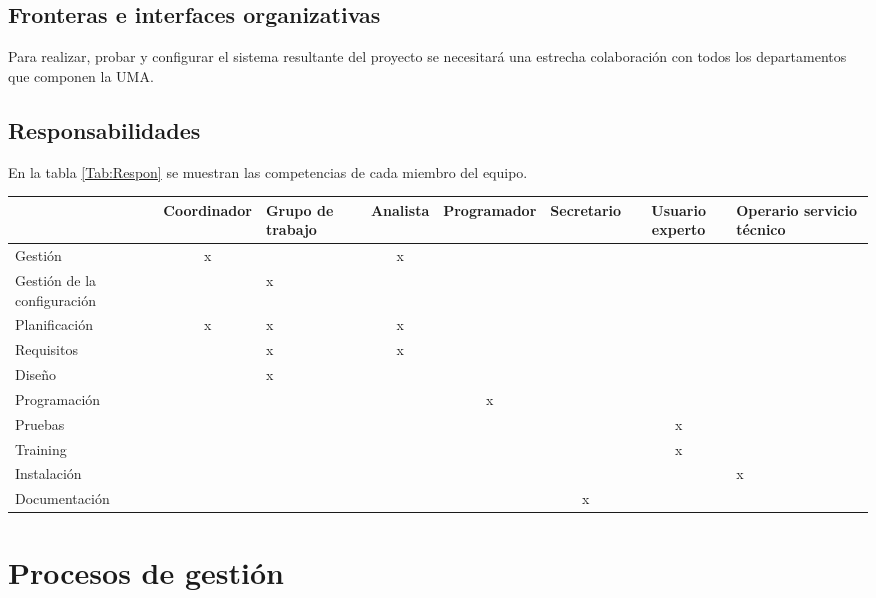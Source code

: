\documentclass[11pt,a4paper,spanish,twoside]{report}
\begin{document}
\section{Fronteras e interfaces organizativas}
Para realizar, probar y configurar el sistema resultante del proyecto se 
necesitará una estrecha colaboración con todos los departamentos que componen 
la UMA. 

\section{Responsabilidades}
En la tabla \ref{Tab:Respon} se muestran las competencias de cada miembro del
equipo.
\begin{sidewaystable}[!h]
  \centering
  \scriptsize
  \begin{tabular}{l|c|b{1.5cm}<{\centering}|c|c|c|c|b{2.5cm}<{\centering}}
    & \textbf{Coordinador} & \textbf{Grupo de trabajo} &
    \textbf{Analista} & \textbf{Programador} & \textbf{Secretario} &
    \textbf{Usuario experto} & \textbf{Operario servicio técnico}\\
    \hline \hline
    Gestión                     & x &   & x &   &   &   &    \\ 
    \hline
    Gestión de la configuración &   & x &   &   &   &   &    \\
    \hline
    Planificación               & x & x & x &   &   &   &    \\
    \hline
    Requisitos                  &   & x & x &   &   &   &    \\
    \hline
    Diseño                      &   & x &   &   &   &   &    \\
    \hline
    Programación                &   &   &   & x &   &   &    \\
    \hline
    Pruebas                     &   &   &   &   &   & x &    \\
    \hline
    Training                    &   &   &   &   &   & x &    \\
    \hline
    Instalación                 &   &   &   &   &   &   & x  \\
    \hline
    Documentación               &   &   &   &   & x &   &    \\
    \hline
  \end{tabular}
  \caption{Responsabilidades de los miembros} \label{Tab:Respon}
\end{sidewaystable}

\chapter{Procesos de gestión}
\end{document}
